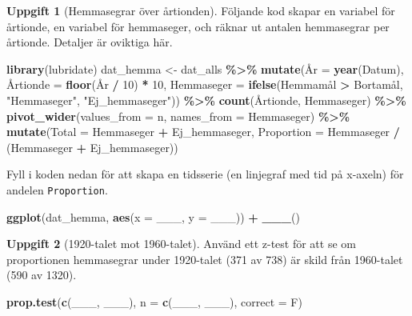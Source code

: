 \documentclass[
]{book}
\newenvironment{Shaded}{\begin{snugshade}}{\end{snugshade}}
\newcommand{\AttributeTok}[1]{\textcolor[rgb]{0.13,0.29,0.53}{#1}}
\newcommand{\DecValTok}[1]{\textcolor[rgb]{0.00,0.00,0.81}{#1}}
\newcommand{\FunctionTok}[1]{\textcolor[rgb]{0.13,0.29,0.53}{\textbf{#1}}}
\newcommand{\NormalTok}[1]{#1}
\newcommand{\OtherTok}[1]{\textcolor[rgb]{0.56,0.35,0.01}{#1}}
\newcommand{\SpecialCharTok}[1]{\textcolor[rgb]{0.81,0.36,0.00}{\textbf{#1}}}
\newcommand{\StringTok}[1]{\textcolor[rgb]{0.31,0.60,0.02}{#1}}
\theoremstyle{definition}
\theoremstyle{definition}
\theoremstyle{definition}
\newtheorem{exercise}{Uppgift}[chapter]
\theoremstyle{definition}
\theoremstyle{remark}
\begin{document}
\begin{exercise}[Hemmasegrar över årtionden]
Följande kod skapar en variabel för årtionde, en variabel för hemmaseger, och räknar ut antalen hemmasegrar per årtionde. Detaljer är oviktiga här.

\begin{Shaded}
\begin{Highlighting}[]
\FunctionTok{library}\NormalTok{(lubridate)}
\NormalTok{dat\_hemma }\OtherTok{\textless{}{-}}\NormalTok{ dat\_alls }\SpecialCharTok{\%\textgreater{}\%} 
  \FunctionTok{mutate}\NormalTok{(Å}\AttributeTok{r =} \FunctionTok{year}\NormalTok{(Datum),}
\NormalTok{         Å}\AttributeTok{rtionde =} \FunctionTok{floor}\NormalTok{(År }\SpecialCharTok{/} \DecValTok{10}\NormalTok{) }\SpecialCharTok{*} \DecValTok{10}\NormalTok{,}
         \AttributeTok{Hemmaseger =} \FunctionTok{ifelse}\NormalTok{(Hemmamål }\SpecialCharTok{\textgreater{}}\NormalTok{ Bortamål, }\StringTok{"Hemmaseger"}\NormalTok{, }\StringTok{"Ej\_hemmaseger"}\NormalTok{)) }\SpecialCharTok{\%\textgreater{}\%} 
  \FunctionTok{count}\NormalTok{(Årtionde, Hemmaseger) }\SpecialCharTok{\%\textgreater{}\%} 
  \FunctionTok{pivot\_wider}\NormalTok{(}\AttributeTok{values\_from =}\NormalTok{ n, }\AttributeTok{names\_from =}\NormalTok{ Hemmaseger) }\SpecialCharTok{\%\textgreater{}\%} 
  \FunctionTok{mutate}\NormalTok{(}\AttributeTok{Total =}\NormalTok{ Hemmaseger }\SpecialCharTok{+}\NormalTok{ Ej\_hemmaseger,}
         \AttributeTok{Proportion =}\NormalTok{ Hemmaseger }\SpecialCharTok{/}\NormalTok{ (Hemmaseger }\SpecialCharTok{+}\NormalTok{ Ej\_hemmaseger))}
\end{Highlighting}
\end{Shaded}

Fyll i koden nedan för att skapa en tidsserie (en linjegraf med tid på x-axeln) för andelen \texttt{Proportion}.

\begin{Shaded}
\begin{Highlighting}[]
\FunctionTok{ggplot}\NormalTok{(dat\_hemma, }\FunctionTok{aes}\NormalTok{(}\AttributeTok{x =}\NormalTok{ \_\_\_, }\AttributeTok{y =}\NormalTok{ \_\_\_)) }\SpecialCharTok{+}
  \FunctionTok{\_\_\_}\NormalTok{()}
\end{Highlighting}
\end{Shaded}

\end{exercise}

\begin{exercise}[1920-talet mot 1960-talet]

Använd ett z-test för att se om proportionen hemmasegrar under 1920-talet (371 av 738) är skild från 1960-talet (590 av 1320).

\begin{Shaded}
\begin{Highlighting}[]
\FunctionTok{prop.test}\NormalTok{(}\FunctionTok{c}\NormalTok{(\_\_\_, \_\_\_), }\AttributeTok{n =} \FunctionTok{c}\NormalTok{(\_\_\_, \_\_\_), }\AttributeTok{correct =}\NormalTok{ F)}
\end{Highlighting}
\end{Shaded}

\end{exercise}
\end{document}
